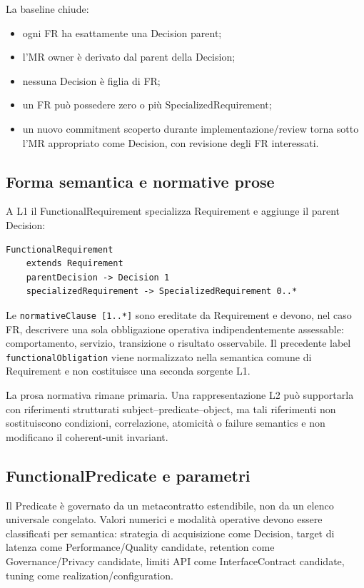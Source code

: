 \documentclass[12pt,a4paper,oneside]{report}
\begin{document}
La baseline chiude:
\begin{itemize}
  \item ogni FR ha esattamente una Decision parent;
  \item l'MR owner è derivato dal parent della Decision;
  \item nessuna Decision è figlia di FR;
  \item un FR può possedere zero o più SpecializedRequirement;
  \item un nuovo commitment scoperto durante implementazione/review torna sotto l'MR appropriato come Decision, con revisione degli FR interessati.
\end{itemize}

\subsection{Forma semantica e normative prose}

A L1 il FunctionalRequirement specializza Requirement e aggiunge il parent Decision:
\begin{lstlisting}
FunctionalRequirement
    extends Requirement
    parentDecision -> Decision 1
    specializedRequirement -> SpecializedRequirement 0..*
\end{lstlisting}

Le \texttt{normativeClause [1..*]} sono ereditate da Requirement e devono, nel caso FR, descrivere una sola obbligazione operativa indipendentemente assessable: comportamento, servizio, transizione o risultato osservabile. Il precedente label \texttt{functionalObligation} viene normalizzato nella semantica comune di Requirement e non costituisce una seconda sorgente L1.

La prosa normativa rimane primaria. Una rappresentazione L2 può supportarla con riferimenti strutturati subject--predicate--object, ma tali riferimenti non sostituiscono condizioni, correlazione, atomicità o failure semantics e non modificano il coherent-unit invariant.

\subsection{FunctionalPredicate e parametri}

Il Predicate è governato da un metacontratto estendibile, non da un elenco universale congelato. Valori numerici e modalità operative devono essere classificati per semantica: strategia di acquisizione come Decision, target di latenza come Performance/Quality candidate, retention come Governance/Privacy candidate, limiti API come InterfaceContract candidate, tuning come realization/configuration.
\end{document}
